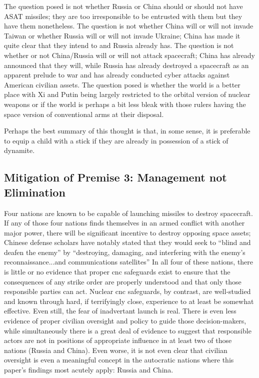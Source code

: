 The question posed is not whether Russia or China should or should not
have ASAT missiles; they are too irresponsible to be entrusted with
them but they have them nonetheless.  The question is not whether
China will or will not invade Taiwan or whether Russia will or will
not invade Ukraine; China has made it quite clear that they intend
to\cite{china-cant-wait} and Russia already has. The question is not
whether or not China/Russia will or will not attack spacecraft; China
has already announced that they will\cite[p65]{dod-china-2020}, while
Russia has already destroyed a spacecraft as an apparent prelude to
war and has already conducted cyber attacks against American civilian
assets.\cite{viasat}\cite[02-17]{brian} The question posed is whether
the world is a better place with Xi and Putin being largely restricted
to the orbital version of nuclear weapons or if the world is perhaps a
bit less bleak with those rulers having the space version of
conventional arms at their disposal.

Perhaps the best summary of this thought is that, in some sense, it is
preferable to equip a child with a stick if they are already in
possession of a stick of dynamite.


\subsection{Mitigation of Premise 3: Management not Elimination}
Four nations are known to be capable of launching missiles to destroy
spacecraft.\cite{brian} If any of those four nations finds themselves
in an armed conflict with another major power, there will be
significant incentive to destroy opposing space assets; Chinese
defense scholars have notably stated that they would seek to ``blind
and deafen the enemy'' by ``destroying, damaging, and interfering with
the enemy's reconnaissance...and communications
satellites''\cite[p65]{dod-china-2020} In all four of these nations,
there is little or no evidence that proper \ac{cnc} safeguards exist
to ensure that the consequences of any strike order are properly
understood and that only those responsible parties can act.  Nuclear
\ac{cnc} safeguards, by contrast, are well-studied and known through
hard, if terrifyingly close, experience to at least be somewhat
effective.\cite{petrov-knows-best} Even still, the fear of inadvertant
launch is real.\cite{colbert} There is even less evidence of proper
civilian oversight and policy to guide those decision-makers, while
simultaneously there is a great deal of evidence to suggest that
responsible actors are not in positions of appropriate influence in at
least two of those nations (Russia and China). Even worse, it is not
even clear that civilian oversight is even a meaningful concept in the
autocratic nations where this paper's findings most acutely apply:
Russia and China.\cite{dictator}

